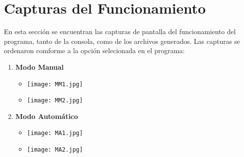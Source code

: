 \documentclass{article}
\begin{document}
	\section*{Capturas del Funcionamiento}
	En esta sección se encuentran las capturas de pantalla del funcionamiento del programa, tanto de la consola, como de los archivos generados.
	Las capturas se ordenaron comforme a la opción selecionada en el programa: 
	\begin{enumerate}
		\item \textbf{Modo Manual}
		\begin{itemize}
			\item \texttt{[image: MM1.jpg]}
			\item \texttt{[image: MM2.jpg]}			
		\end{itemize}				
		\item \textbf{Modo Automático}
		\begin{itemize}
			\item \texttt{[image: MA1.jpg]}
			\item \texttt{[image: MA2.jpg]}			
		\end{itemize}
	\end{enumerate}
\end{document}
